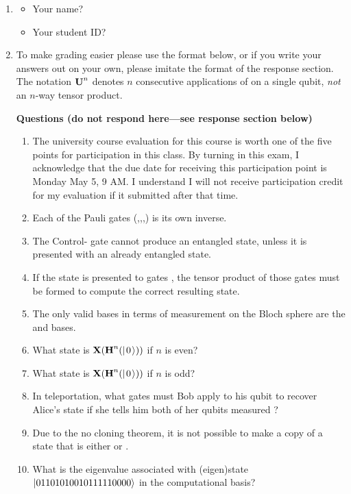 \documentclass[12pt]{article}
\begin{document}
\begin{enumerate}
    \item{} \begin{itemize}
    \item Your name? \Blank[3in]{}
    \item Your student ID? \Blank[3in]{}
\end{itemize}

\item {} To make grading easier please use the format below, or if you write your answers out on your own, please imitate the format of the response section.  The notation $\mbox{\bfseries{\textrm{U}}}^{n}$ denotes $n$ consecutive applications of  on a single qubit, \emph{not} an $n$-way tensor product.

\textbf{Questions (do not respond here---see response section below)}
\begin{enumerate}[label=\theenumi.\arabic*]
   \item\label{tf:a} The university course evaluation for this course is worth one of the five points for
participation in this class. By turning in this exam, I acknowledge that the due
date for receiving this participation point is Monday May 5, 9 AM.  I understand I will not receive participation credit for my evaluation if it submitted after that time.
   \item\label{tf:b} Each of the Pauli gates (\PauliX,\PauliY,\PauliZ,\Hadamard) is its own inverse.
   \item\label{tf:c} The Control-\PauliZ{} gate cannot produce an entangled state, unless it is presented with an already entangled state.
   \item\label{tf:d} If the state  is presented to gates \TensProd{\Hadamard}{\PauliX}, the tensor product of those gates must be formed to compute the correct resulting state.
   \item\label{tf:e} The only valid bases in terms of measurement on the Bloch sphere are the \PauliZ{} and \PauliX{} bases.
   \item\label{tf:f} What state is $\PauliX(\Hadamard^{n}(\QZero))$ if $n$ is even?
      \item\label{tf:g} What state is $\PauliX(\Hadamard^{n}(\QZero))$ if $n$ is odd?
    \item\label{tf:h} In teleportation, what gates must Bob apply to his qubit to recover Alice's state if she tells him both of her qubits measured \QOne{}?
    \item\label{tf:i} Due to the no cloning theorem, it is not possible to make a copy of a state that is either \QZero{} or \QOne{}.
    \item\label{tf:j} What is the eigenvalue associated with (eigen)state $\ket{01101010010111110000}$ in the computational basis?
\end{enumerate}


\end{enumerate}
\end{document}
